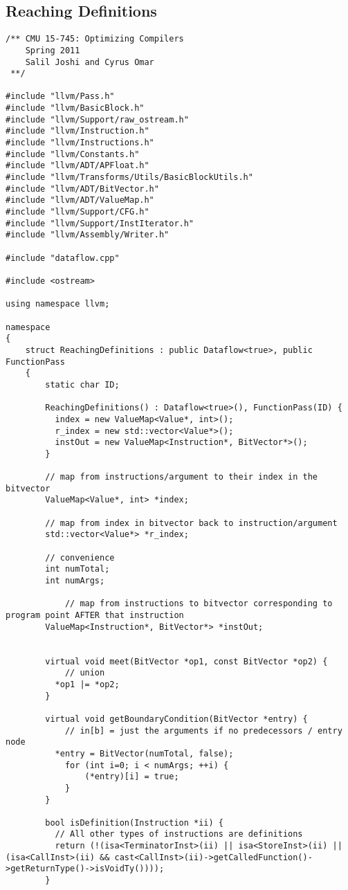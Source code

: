 \documentclass[12pt]{article}
\begin{document}
\subsection{Reaching Definitions}
\begin{verbatim}
/** CMU 15-745: Optimizing Compilers
    Spring 2011
    Salil Joshi and Cyrus Omar
 **/

#include "llvm/Pass.h"
#include "llvm/BasicBlock.h"
#include "llvm/Support/raw_ostream.h"
#include "llvm/Instruction.h"
#include "llvm/Instructions.h"
#include "llvm/Constants.h"
#include "llvm/ADT/APFloat.h"
#include "llvm/Transforms/Utils/BasicBlockUtils.h"
#include "llvm/ADT/BitVector.h"
#include "llvm/ADT/ValueMap.h"
#include "llvm/Support/CFG.h"
#include "llvm/Support/InstIterator.h"
#include "llvm/Assembly/Writer.h"

#include "dataflow.cpp"

#include <ostream>

using namespace llvm;

namespace
{
    struct ReachingDefinitions : public Dataflow<true>, public FunctionPass
    {
        static char ID;

        ReachingDefinitions() : Dataflow<true>(), FunctionPass(ID) {
          index = new ValueMap<Value*, int>();
          r_index = new std::vector<Value*>();
          instOut = new ValueMap<Instruction*, BitVector*>();
        }

        // map from instructions/argument to their index in the bitvector
        ValueMap<Value*, int> *index;
        
        // map from index in bitvector back to instruction/argument
        std::vector<Value*> *r_index;
        
        // convenience
        int numTotal;
        int numArgs;

		    // map from instructions to bitvector corresponding to program point AFTER that instruction
        ValueMap<Instruction*, BitVector*> *instOut;

        
        virtual void meet(BitVector *op1, const BitVector *op2) {
        	// union
          *op1 |= *op2;
        }

        virtual void getBoundaryCondition(BitVector *entry) {
        	// in[b] = just the arguments if no predecessors / entry node
          *entry = BitVector(numTotal, false);
         	for (int i=0; i < numArgs; ++i) {
         		(*entry)[i] = true;
         	} 	
        }
        
        bool isDefinition(Instruction *ii) {
          // All other types of instructions are definitions
          return (!(isa<TerminatorInst>(ii) || isa<StoreInst>(ii) || (isa<CallInst>(ii) && cast<CallInst>(ii)->getCalledFunction()->getReturnType()->isVoidTy())));
        }


\end{verbatim}
\end{document}

